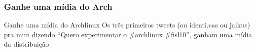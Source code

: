 \documentclass{beamer}
\begin{document}
\begin{frame}
    \frametitle{Ganhe uma mídia do Arch}
    \begin{block}{Ganhe uma mídia do Archlinux}
            Os três primeiros tweets (ou identi.cas ou jaikus) pra mim dizendo 
            ``Quero experimentar o \#archlinux \#fisl10'', ganham uma mídia da distribuição
    \end{block}
\end{frame}
\end{document}
